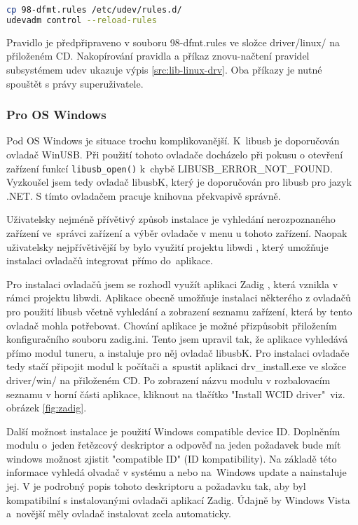 \begin{lstlisting}[language=bash, label=src:lib-linux-drv, caption=Přídání udev pravidla.]
cp 98-dfmt.rules /etc/udev/rules.d/
udevadm control --reload-rules
\end{lstlisting}

Pravidlo je předpřipraveno v souboru 98-dfmt.rules ve složce driver/linux/ na přiloženém CD. Nakopírování pravidla a příkaz znovu-načtení pravidel subsystémem udev ukazuje výpis \ref{src:lib-linux-drv}. Oba příkazy je nutné spouštět s právy superuživatele.

\subsubsection{Pro OS Windows}
Pod OS Windows je situace trochu komplikovanější. K~libusb je doporučován ovladač WinUSB. Při použití tohoto ovladače docházelo při pokusu o otevření zařízení funkcí \verb|libusb_open()| k~chybě LIBUSB\_ERROR\_NOT\_FOUND. Vyzkoušel jsem tedy ovladač libusbK, který je doporučován pro libusb pro jazyk .NET. S tímto ovladačem pracuje knihovna překvapivě správně.

Uživatelsky nejméně přívětivý způsob instalace je vyhledání nerozpoznaného zařízení ve~správci zařízení a výběr ovladače v menu u tohoto zařízení. Naopak uživatelsky nejpřívětivější by bylo využití projektu libwdi \cite{libwdi}, který umožňuje instalaci ovladačů integrovat přímo do~aplikace.


Pro instalaci ovladačů jsem se rozhodl využít aplikaci Zadig \cite{zadig}, která vznikla v rámci projektu libwdi. Aplikace obecně umožňuje instalaci některého z ovladačů pro použití libusb včetně vyhledání a zobrazení seznamu zařízení, která by tento ovladač mohla potřebovat. Chování aplikace je možné přizpůsobit přiložením konfiguračního souboru zadig.ini. Tento jsem upravil tak, že aplikace vyhledává přímo modul tuneru, a instaluje pro něj ovladač libusbK. Pro instalaci ovladače tedy stačí připojit modul k počítači a~spustit aplikaci drv\_install.exe ve složce driver/win/ na přiloženém CD. Po zobrazení názvu modulu v rozbalovacím seznamu v horní části aplikace, kliknout na tlačítko "Install WCID driver"~viz. obrázek \ref{fig:zadig}.

Další možnost instalace je použití Windows compatible device ID. Doplněním modulu o~jeden řetězcový deskriptor a odpověď na jeden požadavek bude mít windows možnost zjistit "compatible ID" (ID kompatibility). Na základě této informace vyhledá olvadač v systému a nebo na~Windows update a nainstaluje jej. V \cite{wcid} je podrobný popis tohoto deskriptoru a požadavku tak, aby byl kompatibilní s instalovanými ovladači aplikací Zadig. Údajně by Windows Vista a~novější měly ovladač instalovat zcela automaticky. 

